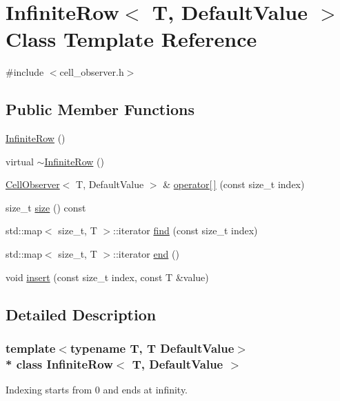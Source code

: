 \hypertarget{classInfiniteRow}{}\section{Infinite\+Row$<$ T, Default\+Value $>$ Class Template Reference}
\label{classInfiniteRow}


{\ttfamily \#include $<$cell\+\_\+observer.\+h$>$}

\subsection*{Public Member Functions}
\begin{DoxyCompactItemize}
\item 
\hyperlink{classInfiniteRow_ab5d574f96b18c889ce001aa54c7fc56f}{Infinite\+Row} ()
\item 
virtual \hyperlink{classInfiniteRow_a35b43c388e4f3e980fbf823fbca37b36}{$\sim$\+Infinite\+Row} ()
\item 
\hyperlink{classCellObserver}{Cell\+Observer}$<$ T, Default\+Value $>$ \& \hyperlink{classInfiniteRow_aa24edf2e7e8ea7c481fc32724cf24b6f}{operator\mbox{[}$\,$\mbox{]}} (const size\+\_\+t index)
\item 
size\+\_\+t \hyperlink{classInfiniteRow_a76e52c26ba4b10c0ff7852e6c449a51b}{size} () const 
\item 
std\+::map$<$ size\+\_\+t, T $>$\+::iterator \hyperlink{classInfiniteRow_a7029e8e6f260ef680a5bcf41ec7095b8}{find} (const size\+\_\+t index)
\item 
std\+::map$<$ size\+\_\+t, T $>$\+::iterator \hyperlink{classInfiniteRow_aab680d59ac893f2878b92299b1f5d933}{end} ()
\item 
void \hyperlink{classInfiniteRow_a15186dbba011c751c84b4d32d2a9e999}{insert} (const size\+\_\+t index, const T \&value)
\end{DoxyCompactItemize}


\subsection{Detailed Description}
\subsubsection*{template$<$typename T, T Default\+Value$>$\\*
class Infinite\+Row$<$ T, Default\+Value $>$}

Indexing starts from 0 and ends at infinity. 

